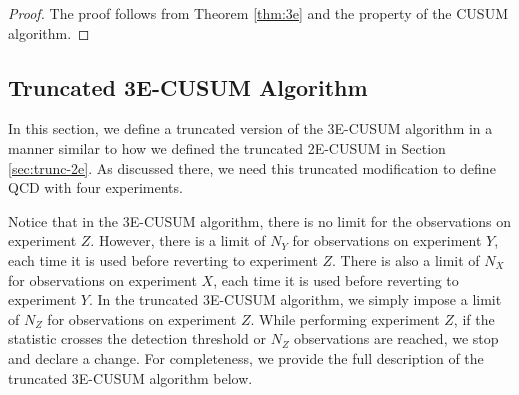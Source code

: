 \documentclass[journal, onecolumn]{IEEEtran}
\begin{document}
\begin{proof}
The proof follows from Theorem \ref{thm:3e} and the property of the CUSUM algorithm. 
\end{proof}




\subsection{Truncated \textup{3E-CUSUM} Algorithm}
\label{sec:trunc-3e}

In this section, we define a truncated version of the 3E-CUSUM algorithm in a manner similar to how we defined the truncated 2E-CUSUM in Section \ref{sec:trunc-2e}. As discussed there, we need this truncated modification to define QCD with four experiments. 

Notice that in the 3E-CUSUM algorithm, there is no limit for the observations on experiment $Z$. However, there is a limit of $N_Y$ for observations on experiment $Y$, each time it is used before reverting to experiment $Z$. There is also a limit of $N_X$ for observations on experiment $X$, each time it is used before reverting to experiment $Y$. In the truncated 3E-CUSUM algorithm, we simply impose a limit of $N_Z$ for observations on experiment $Z$. While performing experiment $Z$, if the statistic crosses the detection threshold or $N_Z$ observations are reached, we stop and declare a change. For completeness, we provide the full description of the truncated 3E-CUSUM algorithm below. 
\end{document}
